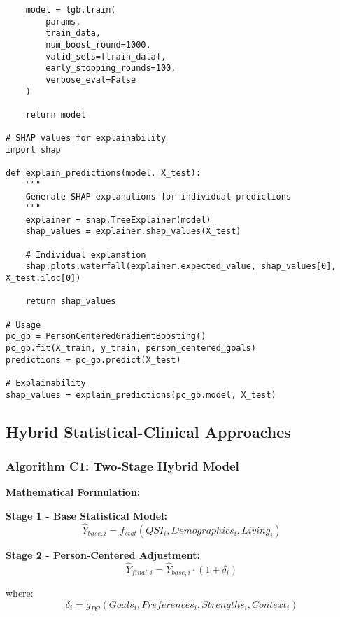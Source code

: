 \begin{lstlisting}
    model = lgb.train(
        params, 
        train_data, 
        num_boost_round=1000,
        valid_sets=[train_data],
        early_stopping_rounds=100,
        verbose_eval=False
    )
    
    return model

# SHAP values for explainability
import shap

def explain_predictions(model, X_test):
    """
    Generate SHAP explanations for individual predictions
    """
    explainer = shap.TreeExplainer(model)
    shap_values = explainer.shap_values(X_test)
    
    # Individual explanation
    shap.plots.waterfall(explainer.expected_value, shap_values[0], X_test.iloc[0])
    
    return shap_values

# Usage
pc_gb = PersonCenteredGradientBoosting()
pc_gb.fit(X_train, y_train, person_centered_goals)
predictions = pc_gb.predict(X_test)

# Explainability
shap_values = explain_predictions(pc_gb.model, X_test)
\end{lstlisting}

\subsection{Hybrid Statistical-Clinical Approaches}

\subsubsection{Algorithm C1: Two-Stage Hybrid Model}

\textbf{Mathematical Formulation:}

\textbf{Stage 1 - Base Statistical Model:}
\begin{equation}
\hat{Y}_{base,i} = f_{stat}(QSI_i, Demographics_i, Living_{i})
\end{equation}

\textbf{Stage 2 - Person-Centered Adjustment:}
\begin{equation}
\hat{Y}_{final,i} = \hat{Y}_{base,i} \cdot (1 + \delta_i)
\end{equation}

where:
\begin{equation}
\delta_i = g_{PC}(Goals_i, Preferences_i, Strengths_i, Context_i)
\end{equation}

